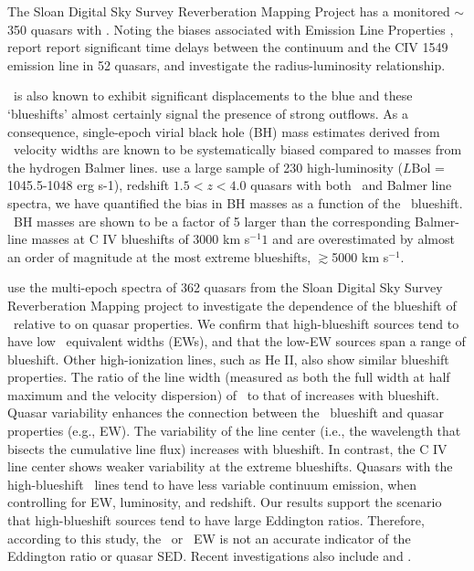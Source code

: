 \documentclass[a4paper,fleqn,usenatbib]{mnras}
\begin{document}
The Sloan Digital Sky Survey Reverberation Mapping Project
\cite[(SDSS-RM)][]{Shen2015} has a monitored $\sim$350 quasars with
\civ. Noting the biases associated with \civ Emission Line Properties
\citep[e.g. increasing systematic offsets with decreasing
signal-to-noise][]{Denney2016}, \citet{Grier2019} report report
significant time delays between the continuum and the CIV 1549
emission line in 52 quasars, and investigate the \civ
radius-luminosity relationship.

\civ\ is also known to exhibit significant displacements to the
blue and these `blueshifts' almost certainly signal the presence of
strong outflows. As a consequence, single-epoch virial black hole (BH)
mass estimates derived from \civ\ velocity widths are known to be
systematically biased compared to masses from the hydrogen Balmer
lines. \citet{Coatman2017} use a large sample of 230 high-luminosity
($L$Bol = 1045.5-1048 erg s-1), redshift $1.5 < z < 4.0$ quasars with
both \civ\ and Balmer line spectra, we have quantified the bias in \civ
BH masses as a function of the \civ\ blueshift. \civ\ BH masses are
shown to be a factor of 5 larger than the corresponding Balmer-line
masses at C IV blueshifts of 3000 km s$^{-1}1$ and are overestimated
by almost an order of magnitude at the most extreme blueshifts,
$\gtrsim$5000 km s$^{-1}$.

\citet{Sun2018} use the multi-epoch spectra of 362 quasars from the
Sloan Digital Sky Survey Reverberation Mapping project to investigate
the dependence of the blueshift of \civ\ relative to \mgii on quasar
properties. We confirm that high-blueshift sources tend to have low
\civ\ equivalent widths (EWs), and that the low-EW sources span a range
of blueshift. Other high-ionization lines, such as He II, also show
similar blueshift properties. The ratio of the line width (measured as
both the full width at half maximum and the velocity dispersion) of
\civ\ to that of \mgii increases with blueshift. Quasar variability
enhances the connection between the \civ\ blueshift and quasar
properties (e.g., EW). The variability of the \mgii line center (i.e.,
the wavelength that bisects the cumulative line flux) increases with
blueshift. In contrast, the C IV line center shows weaker variability
at the extreme blueshifts. Quasars with the high-blueshift \civ\ lines
tend to have less variable continuum emission, when controlling for
EW, luminosity, and redshift. Our results support the scenario that
high-blueshift sources tend to have large Eddington ratios.
Therefore, according to this study, the \civ\ or \heii\ EW is not an
accurate indicator of the Eddington ratio or quasar SED.
Recent investigations also include \citet{Meyer2019} and \citet{Doan2019}. 
\end{document}
